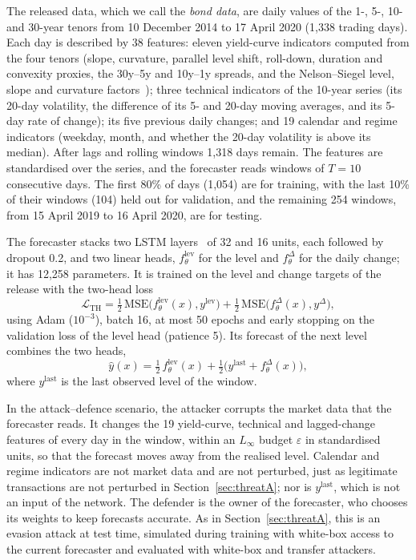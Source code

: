 \documentclass[conference]{IEEEtran}
\newcommand{\cL}{\mathcal{L}}
\begin{document}
The released data, which we call the \emph{bond data}, are daily values of the 1-, 5-, 10- and 30-year tenors from 10 December 2014 to 17 April 2020 (1,338 trading days). Each day is described by 38 features: eleven yield-curve indicators computed from the four tenors (slope, curvature, parallel level shift, roll-down, duration and convexity proxies, the 30y--5y and 10y--1y spreads, and the Nelson--Siegel level, slope and curvature factors~\cite{nelson1987}); three technical indicators of the 10-year series (its 20-day volatility, the difference of its 5- and 20-day moving averages, and its 5-day rate of change); its five previous daily changes; and 19 calendar and regime indicators (weekday, month, and whether the 20-day volatility is above its median). After lags and rolling windows 1,318 days remain. The features are standardised over the series, and the forecaster reads windows of $T{=}10$ consecutive days. The first 80\% of days (1,054) are for training, with the last 10\% of their windows (104) held out for validation, and the remaining 254 windows, from 15 April 2019 to 16 April 2020, are for testing.

The forecaster stacks two LSTM layers~\cite{hochreiter1997} of 32 and 16 units, each followed by dropout 0.2, and two linear heads, $f^{\mathrm{lev}}_\theta$ for the level and $f^{\Delta}_\theta$ for the daily change; it has 12,258 parameters. It is trained on the level and change targets of the release with the two-head loss
\begin{equation}
\cL_{\mathrm{TH}}=\tfrac12\,\mathrm{MSE}\big(f^{\mathrm{lev}}_\theta(x),y^{\mathrm{lev}}\big)+\tfrac12\,\mathrm{MSE}\big(f^{\Delta}_\theta(x),y^{\Delta}\big),
\label{eq:LTH}
\end{equation}
using Adam ($10^{-3}$), batch 16, at most 50 epochs and early stopping on the validation loss of the level head (patience 5). Its forecast of the next level combines the two heads,
\begin{equation}
\hat y(x)=\tfrac12\,f^{\mathrm{lev}}_\theta(x)+\tfrac12\big(y^{\mathrm{last}}+f^{\Delta}_\theta(x)\big),
\label{eq:hybrid}
\end{equation}
where $y^{\mathrm{last}}$ is the last observed level of the window.

\label{sec:threatR}In the attack--defence scenario, the attacker corrupts the market data that the forecaster reads. It changes the 19 yield-curve, technical and lagged-change features of every day in the window, within an $L_\infty$ budget $\varepsilon$ in standardised units, so that the forecast moves away from the realised level. Calendar and regime indicators are not market data and are not perturbed, just as legitimate transactions are not perturbed in Section~\ref{sec:threatA}; nor is $y^{\mathrm{last}}$, which is not an input of the network. The defender is the owner of the forecaster, who chooses its weights to keep forecasts accurate. As in Section~\ref{sec:threatA}, this is an evasion attack at test time, simulated during training with white-box access to the current forecaster and evaluated with white-box and transfer attackers.
\end{document}
